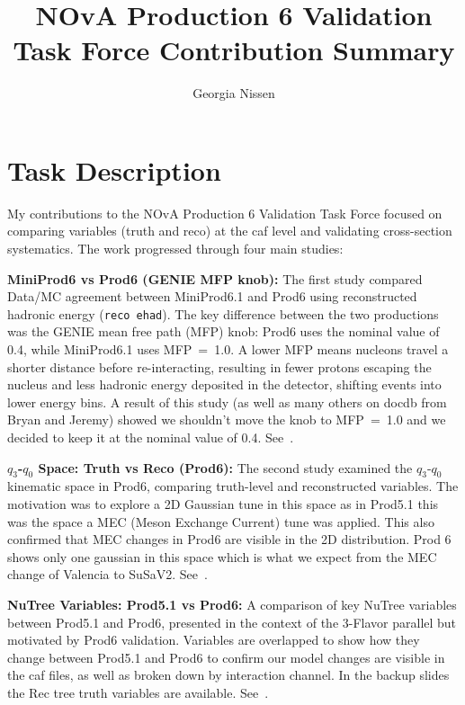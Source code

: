 \documentclass{article}
\title{NOvA Production 6 Validation Task Force Contribution Summary}
\author{Georgia Nissen}
\begin{document}
\maketitle

\section{Task Description}

My contributions to the NOvA Production 6 Validation Task Force focused on comparing variables (truth and reco) at the caf level and validating cross-section systematics. The work progressed through four main studies:

\medskip

\textbf{MiniProd6 vs Prod6 (GENIE MFP knob):} The first study compared Data/MC agreement between MiniProd6.1 and Prod6 using reconstructed hadronic energy (\texttt{reco ehad}). The key difference between the two productions was the GENIE mean free path (MFP) knob: Prod6 uses the nominal value of 0.4, while MiniProd6.1 uses MFP~=~1.0. A lower MFP means nucleons travel a shorter distance before re-interacting, resulting in fewer protons escaping the nucleus and less hadronic energy deposited in the detector, shifting events into lower energy bins. A result of this study (as well as many others on docdb from Bryan and Jeremy) showed we shouldn't move the knob to MFP~=~1.0 and we decided to keep it at the nominal value of 0.4. See~\cite{gnissen-miniprod6-prod6}.

\medskip

\textbf{$q_3$-$q_0$ Space: Truth vs Reco (Prod6):} The second study examined the $q_3$-$q_0$ kinematic space in Prod6, comparing truth-level and reconstructed variables. The motivation was to explore a 2D Gaussian tune in this space as in Prod5.1 this was the space a MEC (Meson Exchange Current) tune was applied. This also confirmed that MEC changes in Prod6 are visible in the 2D distribution. Prod 6 shows only one gaussian in this space which is what we expect from the MEC change of Valencia to SuSaV2. See~\cite{gnissen-q3q0}.

\medskip

\textbf{NuTree Variables: Prod5.1 vs Prod6:} A comparison of key NuTree variables between Prod5.1 and Prod6, presented in the context of the 3-Flavor parallel but motivated by Prod6 validation. Variables are overlapped to show how they change between Prod5.1 and Prod6 to confirm our model changes are visible in the caf files, as well as broken down by interaction channel. In the backup slides the Rec tree truth variables are available.  See~\cite{gnissen-nutree}.
\end{document}
